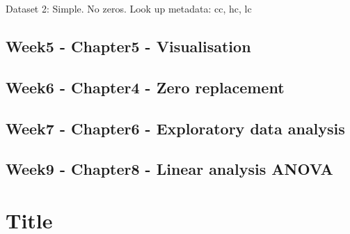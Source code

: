 \documentclass{article}
\begin{document}
Dataset 2: Simple. No zeros. Look up metadata: cc, hc, lc \newline


 
\subsection{Week5 - Chapter5 - Visualisation} 
\subsection{Week6 - Chapter4 - Zero replacement} 
\subsection{Week7 - Chapter6 - Exploratory data analysis } 
\subsection{Week9 - Chapter8 - Linear analysis ANOVA} 



\section{Title}
\end{document}
